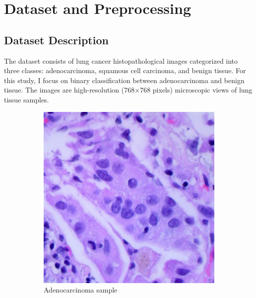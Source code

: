 \documentclass[10pt,twocolumn]{article}
\begin{document}
\section{Dataset and Preprocessing}
\subsection{Dataset Description}
The dataset consists of lung cancer histopathological images categorized into three classes: adenocarcinoma, squamous cell carcinoma, and benign tissue. For this study, I focus on binary classification between adenocarcinoma and benign tissue. The images are high-resolution (768×768 pixels) microscopic views of lung tissue samples.

\begin{figure}[h]
\centering
\begin{subfigure}{0.48\columnwidth}
\includegraphics[width=\linewidth]{imgs/adenocarcinoma.jpg}
\caption{Adenocarcinoma sample}
\end{subfigure}
\hfill
\begin{subfigure}{0.48\columnwidth}

\end{subfigure}
\end{figure}
\end{document}
